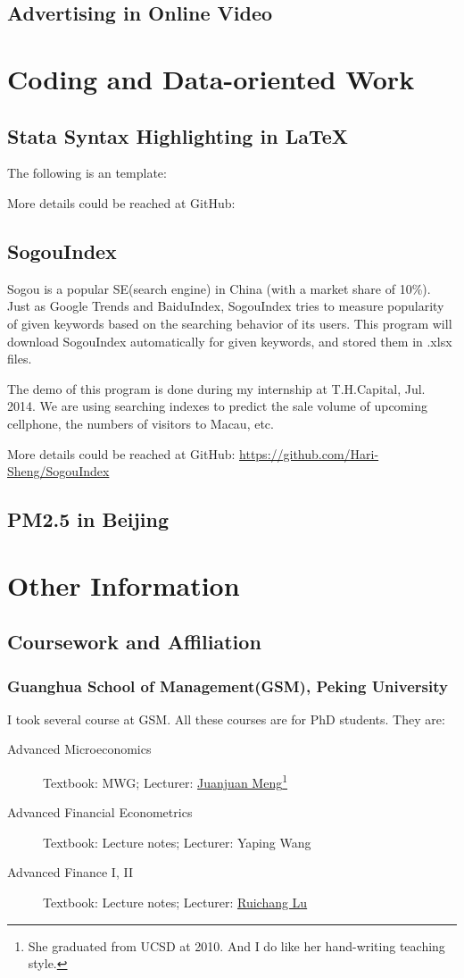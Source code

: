 \documentclass{article}
\begin{document}
\subsection{Advertising in Online Video}

\newpage
\section{Coding and Data-oriented Work}
\subsection{Stata Syntax Highlighting in \LaTeX}	
The following is an template:

More details could be reached at GitHub:
\subsection{SogouIndex}
Sogou is a popular SE(search engine) in China (with a market share of 10\%). Just as Google Trends and BaiduIndex, SogouIndex tries to measure popularity of given keywords based on the searching behavior of its users. This program will download SogouIndex automatically for given keywords, and stored them in .xlsx files.

The demo of this program is done during my internship at T.H.Capital, Jul. 2014. We are using searching indexes to predict the sale volume of upcoming cellphone, the numbers of visitors to Macau, etc. 

More details could be reached at GitHub: \url{https://github.com/Hari-Sheng/SogouIndex}

\subsection{PM2.5 in Beijing}

\newpage
\section{Other Information}
\subsection{Coursework and Affiliation}
\subsubsection{Guanghua School of Management(GSM), Peking University}
I took several course at GSM. All these courses are for PhD students. They are: 
\begin{description}
\item[Advanced Microeconomics] Textbook: MWG; Lecturer: \href{https://ideas.repec.org/f/pme419.html}{Juanjuan Meng}\footnote{She graduated from UCSD at 2010. And I do like her hand-writing teaching style.}
\item[Advanced Financial Econometrics] Textbook: Lecture notes; Lecturer: Yaping Wang
\item[Advanced Finance I, II] Textbook: Lecture notes; Lecturer: \href{https://ideas.repec.org/f/plu286.html}{Ruichang Lu}


\end{description}
\end{document}
